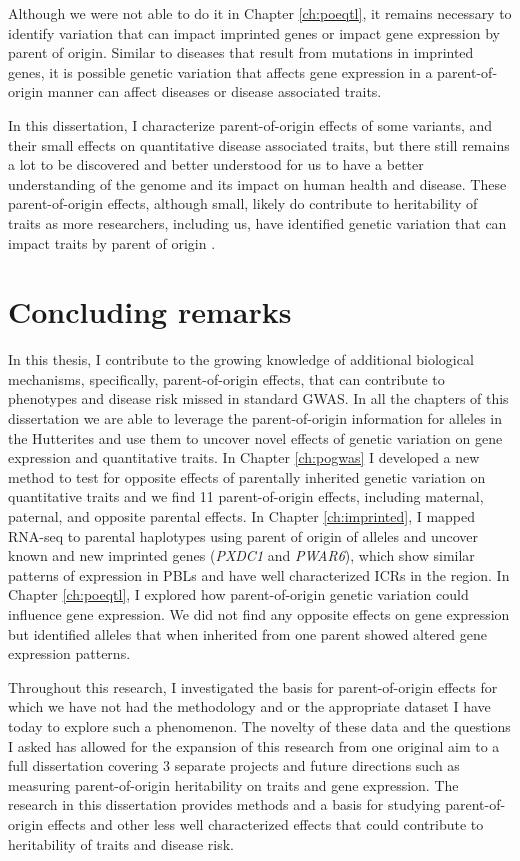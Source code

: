 Although we were not able to do it in Chapter \ref{ch:poeqtl}, it remains necessary to identify variation that can impact imprinted genes or impact gene expression by parent of origin. Similar to diseases that result from mutations in imprinted genes, it is possible genetic variation that affects gene expression in a parent-of-origin manner can affect diseases or disease associated traits. 

In this dissertation, I characterize parent-of-origin effects of some variants, and their small effects on quantitative disease associated traits, but there still remains a lot to be discovered and better understood for us to have a better understanding of the genome and its impact on human health and disease. These parent-of-origin effects, although small, likely do contribute to heritability of traits as more researchers, including us, have identified genetic variation that can impact traits by parent of origin \cite{Benonisdottir:2016dz,Zoledziewska:2015do,Garg2012a,Kong:2009kk}. 


\section{Concluding remarks}

In this thesis, I contribute to the growing knowledge of additional biological mechanisms, specifically, parent-of-origin effects, that can contribute to phenotypes and disease risk missed in standard GWAS. In all the chapters of this dissertation we are able to leverage the parent-of-origin information for alleles in the Hutterites and use them to uncover novel effects of genetic variation on gene expression and quantitative traits. In Chapter \ref{ch:pogwas} I developed a new method to test for opposite effects of parentally inherited genetic variation on quantitative traits and we find 11 parent-of-origin effects, including maternal, paternal, and opposite parental effects. In Chapter \ref{ch:imprinted}, I mapped RNA-seq to parental haplotypes using parent of origin of alleles and uncover known and new imprinted genes (\emph{PXDC1} and \emph{PWAR6}), which show similar patterns of expression in PBLs and have well characterized ICRs in the region. In Chapter \ref{ch:poeqtl}, I explored how parent-of-origin genetic variation could influence gene expression. We did not find any opposite effects on gene expression but identified alleles that when inherited from one parent showed altered gene expression patterns. 

Throughout this research, I investigated the basis for parent-of-origin effects for which we have not had the methodology and or the appropriate dataset I have today to explore such a phenomenon. The novelty of these data and the questions I asked  has allowed for the expansion of this research from one original aim to a full dissertation covering 3 separate projects and future directions such as measuring parent-of-origin heritability on traits and gene expression. The research in this dissertation provides methods and a basis for studying parent-of-origin effects and other less well characterized effects that could contribute to heritability of traits and disease risk. 




